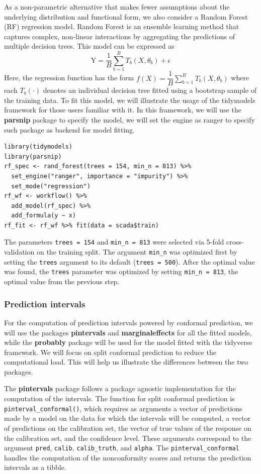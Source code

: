 As a non-parametric alternative that makes fewer assumptions about the
underlying distribution and functional form, we also consider a Random
Forest (RF) regression model. Random Forest is an ensemble learning
method that captures complex, non-linear interactions by aggregating the
predictions of multiple decision trees. This model can be expressed as
\[
\text{Y} = \dfrac{1}{B}\sum_{b=1}^{B}T_{b}(X,\theta_b) + \epsilon
\] Here, the regression function has the form
\(f(X) = \dfrac{1}{B}\sum_{b=1}^{B}T_{b}(X,\theta_b)\) where each
\(T_{b}(\cdot)\) denotes an individual decision tree fitted using a
bootstrap sample of the training data. To fit this model, we will
illustrate the usage of the tidymodels framework for those users
familiar with it. In this framework, we will use the \textbf{parsnip} package to
specify the model, we will set the engine as ranger to specify such
package as backend for model fitting.

\begin{verbatim}
library(tidymodels)
library(parsnip)
rf_spec <- rand_forest(trees = 154, min_n = 813) %>%
  set_engine("ranger", importance = "impurity") %>%
  set_mode("regression")
rf_wf <- workflow() %>%
  add_model(rf_spec) %>%
  add_formula(y ~ x)
rf_fit <- rf_wf %>% fit(data = scada$train)
\end{verbatim}

The parameters \texttt{trees\ =\ 154} and \texttt{min\_n\ =\ 813} were selected via 5-fold cross-validation on the training split. The argument \texttt{min\_n} was optimized first by setting the \texttt{trees} argument to its default (\texttt{trees\ =\ 500}). After the optimal value was found, the \texttt{trees} parameter was optimized by setting \texttt{min\_n\ =\ 813}, the optimal value from the previous step.

\subsubsection{Prediction intervals}\label{prediction-intervals}

For the computation of prediction intervals powered by conformal
prediction, we will use the packages \textbf{pintervals} and
\textbf{marginaleffects} for all the fitted models, while the \textbf{probably}
package will be used for the model fitted with the tidyverse framework.
We will focus on split conformal prediction to reduce the computational
load. This will help us illustrate the differences between the two
packages.

The \textbf{pintervals} package follows a package agnostic implementation for
the computation of the intervals. The function for split conformal
prediction is \texttt{pinterval\_conformal()}, which requires as arguments a
vector of predictions made by a model on the data for which the
intervals will be computed, a vector of predictions on the calibration
set, the vector of true values of the response on the calibration set,
and the confidence level. These arguments correspond to the argument
\texttt{pred}, \texttt{calib}, \texttt{calib\_truth}, and \texttt{alpha}. The \texttt{pinterval\_conformal}
handles the computation of the nonconformity scores and returns the
prediction intervals as a tibble.

